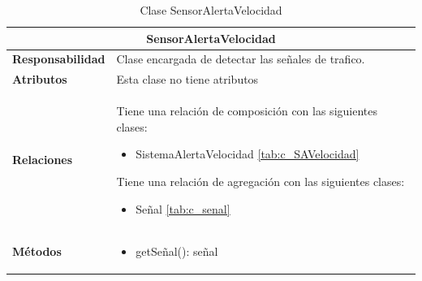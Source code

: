 \begin{table}[H]
\begin{center}
\begin{tabular}{p{} p{11cm}}
\multicolumn{2}{c}{\textbf{SensorAlertaVelocidad} } \\ \hline \hline
\textbf{Responsabilidad} &  Clase encargada de detectar las señales de trafico.   \\ \hline
\textbf{Atributos} & Esta clase no tiene atributos\\ \hline
\textbf{Relaciones} & \par Tiene una relación de composición con las siguientes clases:
                      \begin{itemize}
                        \item SistemaAlertaVelocidad \ref{tab:c_SAVelocidad}
                      \end{itemize}

                      \par Tiene una relación de agregación con las siguientes clases:
                      \begin{itemize}
                        \item Señal \ref{tab:c_senal}
                      \end{itemize}

                      \\ \hline

\textbf{Métodos} &  \begin{itemize}
                      \item getSeñal(): señal
                      \end{itemize}\\ \hline
\end{tabular}
\caption{Clase SensorAlertaVelocidad}
\label{tab:c_SensorAV}
\end{center}
\end{table}









